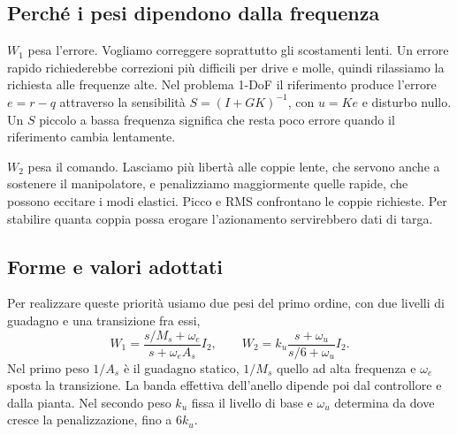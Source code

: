 \begin{center}
\end{center}

\subsection{Perché i pesi dipendono dalla frequenza}

$W_1$ pesa l'errore. Vogliamo correggere soprattutto gli scostamenti
lenti. Un errore rapido richiederebbe correzioni più difficili per
drive e molle, quindi rilassiamo la richiesta alle frequenze alte.
Nel problema 1-DoF il riferimento produce l'errore $e=r-q$
attraverso la sensibilità $S=(I+GK)^{-1}$, con $u=Ke$ e disturbo
nullo. Un $S$ piccolo a bassa frequenza significa che resta poco
errore quando il riferimento cambia lentamente.

$W_2$ pesa il comando. Lasciamo più libertà alle coppie lente,
che servono anche a sostenere il manipolatore, e penalizziamo
maggiormente quelle rapide, che possono eccitare i modi elastici.
Picco e RMS confrontano le coppie richieste. Per stabilire quanta
coppia possa erogare l'azionamento servirebbero dati di targa.

\subsection{Forme e valori adottati}

Per realizzare queste priorità usiamo due pesi del primo ordine,
con due livelli di guadagno e una transizione fra essi,
\begin{equation}\label{eq:hinfweights}
 W_1=\frac{s/M_s+\omega_e}{s+\omega_e A_s}I_2,\qquad
 W_2=k_u\frac{s+\omega_u}{s/6+\omega_u}I_2.
\end{equation}
Nel primo peso $1/A_s$ è il guadagno statico, $1/M_s$ quello ad
alta frequenza e $\omega_e$ sposta la transizione. La banda
effettiva dell'anello dipende poi dal controllore e dalla pianta.
Nel secondo peso $k_u$ fissa il livello di base e $\omega_u$
determina da dove cresce la penalizzazione, fino a $6k_u$.

